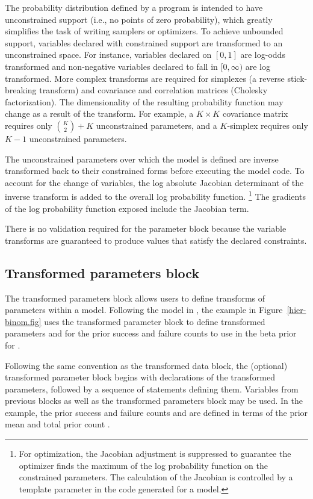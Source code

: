 \documentclass[article]{jss}
\begin{document}
The probability distribution defined by a  program is
intended to have unconstrained support (i.e., no points of zero
probability), which greatly simplifies the task of writing samplers or
optimizers.  To achieve unbounded support, variables declared with
constrained support are transformed to an unconstrained space.  For
instance, variables declared on $[0,1]$ are log-odds transformed and
non-negative variables declared to fall in $[0,\infty)$ are log
transformed.  More complex transforms are required for simplexes (a
reverse stick-breaking transform) and covariance and correlation
matrices (Cholesky factorization).  The dimensionality of the
resulting probability function may change as a result of the
transform. For example, a $K \times K$ covariance matrix requires only
${K \choose 2} + K$ unconstrained parameters, and a $K$-simplex
requires only $K-1$ unconstrained parameters.

The unconstrained parameters over which the model is defined are
inverse transformed back to their constrained forms before executing
the model code.  To account for the change of variables, the log
absolute Jacobian determinant of the inverse transform is added to the
overall log probability function.%
%
\footnote{For optimization, the Jacobian adjustment is suppressed to
  guarantee the optimizer finds the maximum of the log probability
  function on the constrained parameters.  The calculation of the
  Jacobian is controlled by a template parameter in the 
  code generated for a model.}
%
The gradients of the log probability function exposed include the
Jacobian term.  

There is no validation required for the parameter block because the
variable transforms are guaranteed to produce values that satisfy the
declared constraints.


\subsection{Transformed parameters block}

The transformed parameters block allows users to define transforms of
parameters within a model.  Following the model in
\citep{GelmanEtAl:2013}, the example in Figure~\ref{hier-binom.fig}
uses the transformed parameter block to define transformed parameters
 and  for the prior success and failure counts
to use in the beta prior for .  

Following the same convention as the transformed data block, the
(optional) transformed parameter block begins with declarations of the
transformed parameters, followed by a sequence of statements defining
them.  Variables from previous blocks as well as the transformed
parameters block may be used.  In the example, the prior success and
failure counts  and  are defined in terms of
the prior mean  and total prior count .
\end{document}
